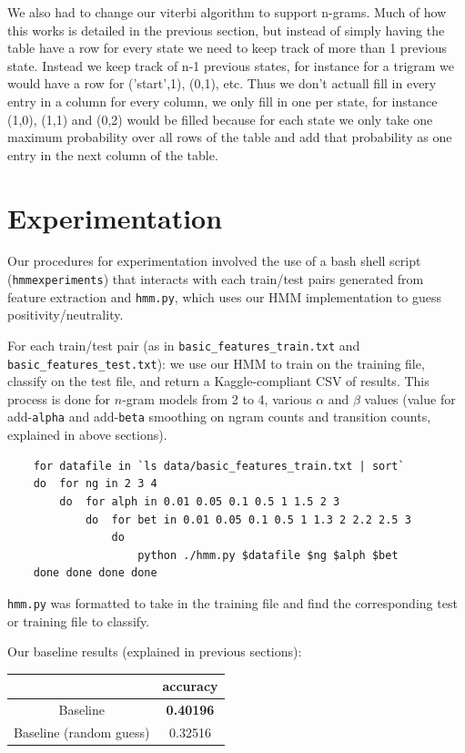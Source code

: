 \documentclass{article}
\begin{document}
We also had to change our viterbi algorithm to support n-grams. Much of how this works is detailed in the previous section, but instead of simply having the table have a row for every state we need to keep track of more than 1 previous state. Instead we keep track of n-1 previous states, for instance for a trigram we would have a row for ('start',1), (0,1), etc. Thus we don't actuall fill in every entry in a column for every column, we only fill in one per state, for instance (1,0), (1,1) and (0,2) would be filled because for each state we only take one maximum probability over all rows of the table and add that probability as one entry in the next column of the table.

\section{Experimentation}

Our procedures for experimentation involved the use of a bash shell script (\texttt{hmmexperiments}) that interacts with each train/test pairs generated from feature extraction and \texttt{hmm.py}, which uses our HMM implementation to guess positivity/neutrality.\par

For each train/test pair (as in \texttt{basic\_features\_train.txt} and \texttt{basic\_features\_test.txt}): we use our HMM to train on the training file, classify on the test file, and return a Kaggle-compliant CSV of results. This process is done for $n$-gram models from 2 to 4, various $\alpha$ and $\beta$ values (value for add-\texttt{alpha} and add-\texttt{beta} smoothing on ngram counts and transition counts, explained in above sections).\par

\begin{verbatim}
    for datafile in `ls data/basic_features_train.txt | sort`
    do  for ng in 2 3 4
        do  for alph in 0.01 0.05 0.1 0.5 1 1.5 2 3
            do  for bet in 0.01 0.05 0.1 0.5 1 1.3 2 2.2 2.5 3
                do
                    python ./hmm.py $datafile $ng $alph $bet
    done done done done
\end{verbatim}

\texttt{hmm.py} was formatted to take in the training file and find the corresponding test or training file to classify.\par

Our baseline results (explained in previous sections):\par\medskip
{\small\begin{tabular}{|c|c|}\hline
                        & accuracy\\\hline
Baseline                & \textbf{0.40196}\\
Baseline (random guess) & 0.32516\\
\end{tabular}}\par
\end{document}
